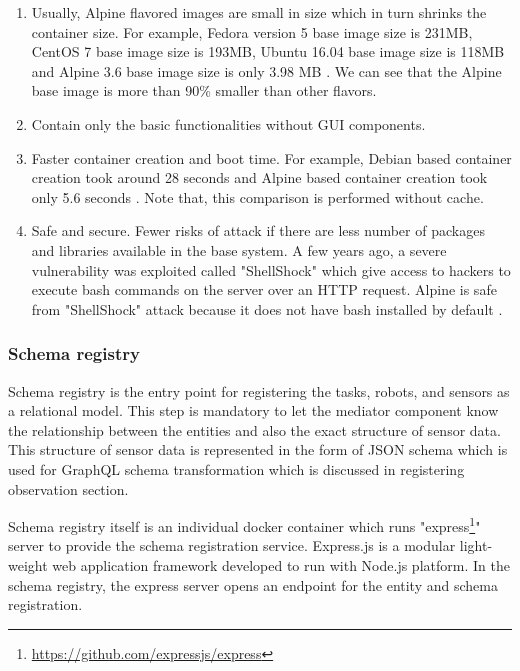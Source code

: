 	\begin{enumerate}
		\item Usually, Alpine flavored images are small in size which in turn shrinks the container size. For example, Fedora version 5 base image size is 231MB, CentOS 7 base image size is 193MB, Ubuntu 16.04 base image size is 118MB and Alpine 3.6 base image size is only 3.98 MB \cite{misc16}. We can see that the Alpine base image is more than 90\% smaller than other flavors. 
		\item Contain only the basic functionalities without GUI components. 
		\item Faster container creation and boot time. For example, Debian based container creation took around 28 seconds and Alpine based container creation took only 5.6 seconds \cite{misc16}. Note that, this comparison is performed without cache.
		\item Safe and secure. Fewer risks of attack if there are less number of packages and libraries available in the base system. A few years ago,  a severe vulnerability was exploited called "ShellShock" which give access to hackers to execute bash commands on the server over an HTTP request. Alpine is safe from "ShellShock" attack because it does not have bash installed by default \cite{misc16}.	
	\end{enumerate}
	
	\subsubsection{Schema registry} \label{subsubsection:schema_registry}
	
	Schema registry is the entry point for registering the tasks, robots, and sensors as a relational model. This step is mandatory to let the mediator component know the relationship between the entities and also the exact structure of sensor data. This structure of sensor data is represented in the form of JSON schema which is used for GraphQL schema transformation which is discussed in registering observation section. 
	
	Schema registry itself is an individual docker container which runs "express\footnote{\href{https://github.com/expressjs/express}{https://github.com/expressjs/express}}" server to provide the schema registration service. Express.js is a modular light-weight web application framework developed to run with Node.js platform. In the schema registry, the express server opens an endpoint for the entity and schema registration.
	
